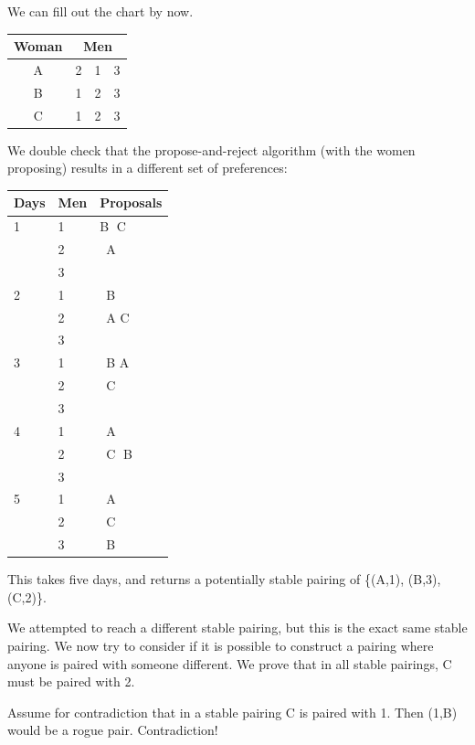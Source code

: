 \documentclass[11pt]{article}
\begin{document}
\begin{qunlist}
\begin{itemize}
{We can fill out the chart by now.
\begin{center}
\begin{tabular}{|c|ccc|}\hline 
Woman&\multicolumn{3}{|c|}{Men}\\\hline 
A&2&1&3\\\hline 
B&1&2&3\\\hline 
C&1&2&3\\\hline
\end{tabular}
\end{center}

We double check that the propose-and-reject algorithm (with the women proposing) 
results in a different set of preferences:
\begin{center}
    \begin{tabular}{| l | l | l |}
    \hline
    Days & Men & Proposals \\ \hline
     1 & 1 & \textcircled{B} C \\ 
       & 2 & \ A \\ 
       & 3 &  \\ \hline
     2 & 1 & \ B  \\ 
       & 2 &   \ A \textcircled{C} \\ 
       & 3 &  \\ \hline
     3 & 1 & \ B \textcircled{A} \\ 
       & 2 & \ C \\ 
       & 3 & \  \\ \hline
     4 & 1 & \ A \\ 
       & 2 & \ \textcircled{C} B\\ 
       & 3 & \ \\ \hline
     5 & 1 & \ A \\ 
       & 2 & \ C\\ 
       & 3 & \ B \\ \hline
    \end{tabular}
\end{center}
This takes five days, and returns a potentially stable pairing of \{(A,1), (B,3), (C,2)\}.

We attempted to reach a different stable pairing, but this is the exact same stable pairing. We now try to consider if it is possible to construct a pairing where anyone is paired with someone different. We prove that in all stable pairings, C must be paired with 2.

Assume for contradiction that in a stable pairing C is paired with 1. 
Then (1,B) would be a rogue pair. Contradiction!

}
\end{itemize}
\end{qunlist}
\end{document}
